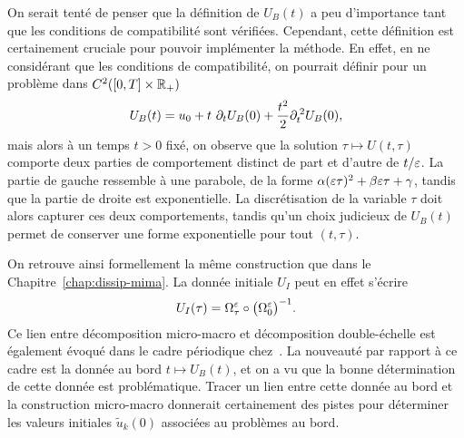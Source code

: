 \begin{FRremark}
    On serait tenté de penser que la définition de $U_B(t)$ a peu d'importance tant que les conditions de compatibilité sont vérifiées. Cependant, cette définition est certainement cruciale pour pouvoir implémenter la méthode. En effet, en ne considérant que les conditions de compatibilité, on pourrait définir pour un problème dans $C^2([0,T] \times \mathbb{R}_+)$
    \begin{equation*}
        U_B(t) = u_0 + t\ \partial_t U_B(0) 
            + \frac{t^2}{2} \partial_t ^{\:2} U_B(0) ,
    \end{equation*}
    mais alors à un temps $t > 0$ fixé, on observe que la solution $\tau \mapsto U(t,\tau)$ comporte deux parties de comportement distinct de part et d'autre de $t/\varepsilon$. La partie de gauche ressemble à une parabole, de la forme $\alpha (\varepsilon\tau)^2 + \beta\varepsilon\tau + \gamma$, tandis que la partie de droite est exponentielle. La discrétisation de la variable $\tau$ doit alors capturer ces deux comportements, tandis qu'un choix judicieux de $U_B(t)$ permet de conserver une forme exponentielle pour tout $(t,\tau)$. 
\end{FRremark}

On retrouve ainsi formellement la même construction que dans le Chapitre~\ref{chap:dissip-mima}. La donnée initiale $U_I$ peut en effet s'écrire  
\begin{equation*}
    U_I(\tau) = \Omega^\varepsilon_\tau \circ \big( \Omega^\varepsilon _0 \big)^{-1} .
\end{equation*}
Ce lien entre décomposition micro-macro et décomposition double-échelle est également évoqué dans le cadre périodique chez~\cite{chartier.2020.derivative}. La nouveauté par rapport à ce cadre est la donnée au bord $t \mapsto U_B(t)$, et on a vu que la bonne détermination de cette donnée est problématique. Tracer un lien entre cette donnée au bord et la construction micro-macro donnerait certainement des pistes pour déterminer les valeurs initiales $\widetilde{u}_k(0)$ associées au problèmes au bord. 